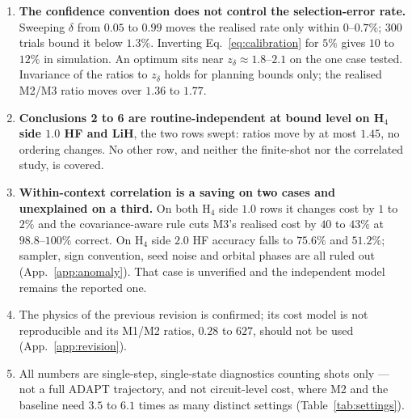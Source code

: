 \documentclass[10pt]{article}
\begin{document}
\begin{enumerate}[leftmargin=2em]
  \item \textbf{The confidence convention does not control the selection-error rate.} Sweeping $\delta$ from $0.05$ to $0.99$ moves the realised rate only within $0$--$0.7\%$; 300 trials bound it below $1.3\%$. Inverting Eq.~\eqref{eq:calibration} for $5\%$ gives $10$ to $12\%$ in simulation. An optimum sits near $z_\delta\approx1.8$--$2.1$ on the one case tested. Invariance of the ratios to $z_\delta$ holds for planning bounds only; the realised M2/M3 ratio moves over $1.36$ to $1.77$.
  \item \textbf{Conclusions 2 to 6 are routine-independent at bound level on H$_4$ side $1.0$ HF and LiH}, the two rows swept: ratios move by at most $1.45$, no ordering changes. No other row, and neither the finite-shot nor the correlated study, is covered.
  \item \textbf{Within-context correlation is a saving on two cases and unexplained on a third.} On both H$_4$ side $1.0$ rows it changes cost by $1$ to $2\%$ and the covariance-aware rule cuts M3's realised cost by $40$ to $43\%$ at $98.8$--$100\%$ correct. On H$_4$ side $2.0$ HF accuracy falls to $75.6\%$ and $51.2\%$; sampler, sign convention, seed noise and orbital phases are all ruled out (App.~\ref{app:anomaly}). That case is unverified and the independent model remains the reported one.
  \item The physics of the previous revision is confirmed; its cost model is not reproducible and its M1/M2 ratios, $0.28$ to $627$, should not be used (App.~\ref{app:revision}).
  \item All numbers are single-step, single-state diagnostics counting shots only --- not a full ADAPT trajectory, and not circuit-level cost, where M2 and the baseline need $3.5$ to $6.1$ times as many distinct settings (Table~\ref{tab:settings}).
\end{enumerate}
\end{document}

